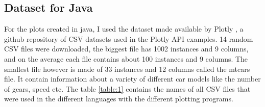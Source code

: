 \documentclass[12pt, a4paper,oneside]{report}
\begin{document}
\subsection{Dataset for Java}
For the plots created in java, I used the dataset made available by Plotly \cite{plotly}, a github repository of CSV datasets used in the Plotly API examples. 14 random CSV files were downloaded, the biggest file has 1002 instances and 9 columns, and on the average each file contains about 100 instances and 9 columns. The smallest file however is made of 33 instances and 12 columns called the mtcars file. It contain information about a variety of different car models like the number of gears, speed etc. The table \ref{table:1} contains the names of all CSV files that were used in the different languages with the different plotting programs.
\end{document}
